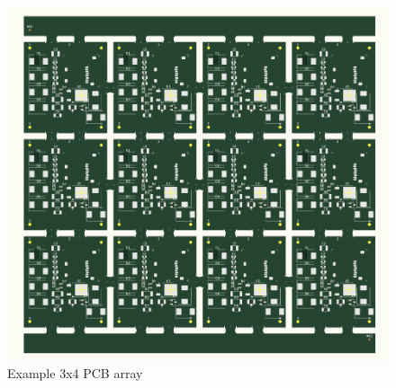 \documentclass[a4paper,10pt]{report}
\begin{document}
\begin{figure}[!htb]
 \centering
 \includegraphics[width=1\textwidth]{panel_mini_a4.png}
 \caption{Example 3x4 PCB array}
\end{figure}
\end{document}
